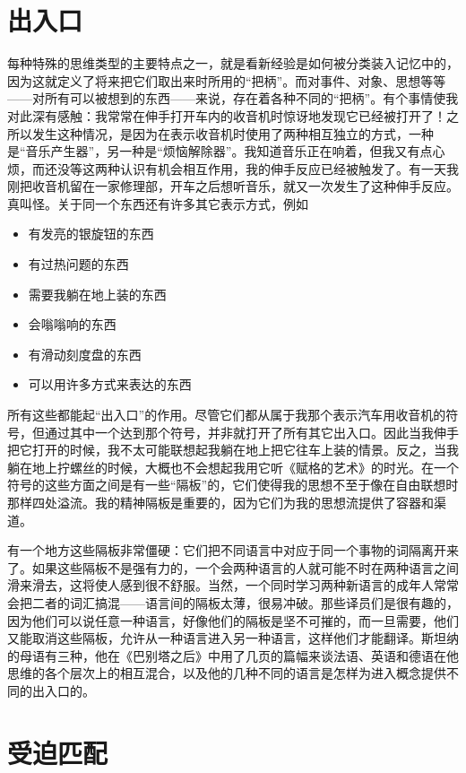 \section{出入口}

每种特殊的思维类型的主要特点之一，就是看新经验是如何被分类装入记忆中的，因为这就定义了将来把它们取出来时所用的“把柄”。而对事件、对象、思想等等——对所有可以被想到的东西——来说，存在着各种不同的“把柄”。有个事情使我对此深有感触：我常常在伸手打开车内的收音机时惊讶地发现它已经被打开了！之所以发生这种情况，是因为在表示收音机时使用了两种相互独立的方式，一种是“音乐产生器”，另一种是“烦恼解除器”。我知道音乐正在响着，但我又有点心烦，而还没等这两种认识有机会相互作用，我的伸手反应已经被触发了。有一天我刚把收音机留在一家修理部，开车之后想听音乐，就又一次发生了这种伸手反应。真叫怪。关于同一个东西还有许多其它表示方式，例如
\begin{itemize}
\item 有发亮的银旋钮的东西
\item 有过热问题的东西
\item 需要我躺在地上装的东西
\item 会嗡嗡响的东西
\item 有滑动刻度盘的东西
\item 可以用许多方式来表达的东西
\end{itemize}
所有这些都能起“出入口”的作用。尽管它们都从属于我那个表示汽车用收音机的符号，但通过其中一个达到那个符号，并非就打开了所有其它出入口。因此当我伸手把它打开的时候，我不太可能联想起我躺在地上把它往车上装的情景。反之，当我躺在地上拧螺丝的时候，大概也不会想起我用它听《赋格的艺术》的时光。在一个符号的这些方面之间是有一些“隔板”的，它们使得我的思想不至于像在自由联想时那样四处溢流。我的精神隔板是重要的，因为它们为我的思想流提供了容器和渠道。

有一个地方这些隔板非常僵硬：它们把不同语言中对应于同一个事物的词隔离开来了。如果这些隔板不是强有力的，一个会两种语言的人就可能不时在两种语言之间滑来滑去，这将使人感到很不舒服。当然，一个同时学习两种新语言的成年人常常会把二者的词汇搞混——语言间的隔板太薄，很易冲破。那些译员们是很有趣的，因为他们可以说任意一种语言，好像他们的隔板是坚不可摧的，而一旦需要，他们又能取消这些隔板，允许从一种语言进入另一种语言，这样他们才能翻译。斯坦纳的母语有三种，他在《巴别塔之后》中用了几页的篇幅来谈法语、英语和德语在他思维的各个层次上的相互混合，以及他的几种不同的语言是怎样为进入概念提供不同的出入口的。

\section{受迫匹配}

